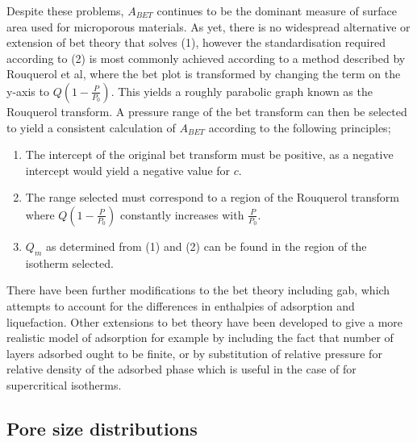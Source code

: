 Despite these problems, $A_{BET}$ continues to be the dominant measure of surface area used for microporous materials. As yet, there is no widespread alternative or extension of \acrshort{bet} theory that solves (1), however the standardisation required according to (2) is most commonly achieved according to a method described by Rouquerol et al, where the \acrshort{bet} plot is transformed by changing the term on the y-axis to $Q \left(1 - \frac{P}{P_0} \right)$. This yields a roughly parabolic graph known as the Rouquerol transform. A pressure range of the \acrshort{bet} transform can then be selected to yield a consistent calculation of $A_{BET}$ according to the following principles;

	\begin{enumerate}[label=(\arabic*)]
		\item The intercept of the original \acrshort{bet} transform must be positive, as a negative intercept would yield a negative value for $c$.
		\item The range selected must correspond to a region of the Rouquerol transform where $Q \left(1 - \frac{P}{P_0} \right)$ constantly increases with $\frac{P}{P_0}$.
		\item $Q_m$ as determined from (1) and (2) can be found in the region of the isotherm selected.\citep{Rouquerol2007Is} 
	\end{enumerate}

There have been further modifications to the \acrshort{bet} theory including \acrfull{gab}, which attempts to account for the differences in enthalpies of adsorption and liquefaction.\citep{Guggenheim1966Applications} Other extensions to \acrshort{bet} theory have been developed to give a more realistic model of adsorption for example by including the fact that number of layers adsorbed ought to be finite, or by substitution of relative pressure for relative density of the adsorbed phase which is useful in the case of for supercritical isotherms.\citep{Brunauer1940, zhou2019modified}

\subsection{Pore size distributions}

